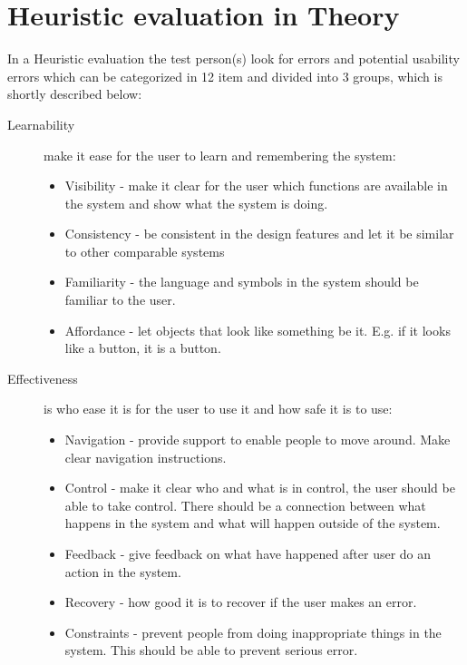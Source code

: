 \section{Heuristic evaluation in Theory}
In a Heuristic evaluation the test person(s) look for errors and potential usability errors which can be categorized in 12 item and divided into 3 groups\citep{DIEB}, which is shortly described below:
\begin{description}
\item[Learnability] make it ease for the user to learn and remembering the system:
\begin{itemize}
	\item Visibility - make it clear for the user which functions are available in the system and show what the system is doing.
	\item Consistency - be consistent in the design features and let it be similar to other comparable systems %
	\item Familiarity - the language and symbols in the system should be familiar to the user.
	\item Affordance - let objects that look like something be it. E.g. if it looks like a button, it is a button. %
\end{itemize}

\item[Effectiveness] is who ease it is for the user to use it and how safe it is to use:
\begin{itemize}
	\item Navigation - provide support to enable people to move around. Make clear navigation instructions.
	\item Control - make it clear who and what is in control, the user should be able to take control. There should be a connection between what happens in the system and what will happen outside of the system. 
	\item Feedback - give feedback on what have happened after user do an action in the system.
	\item Recovery - how good it is to recover if the user makes an error. %
	\item Constraints - prevent people from doing inappropriate things in the system. This should be able to prevent serious error.
\end{itemize}


\end{description}
